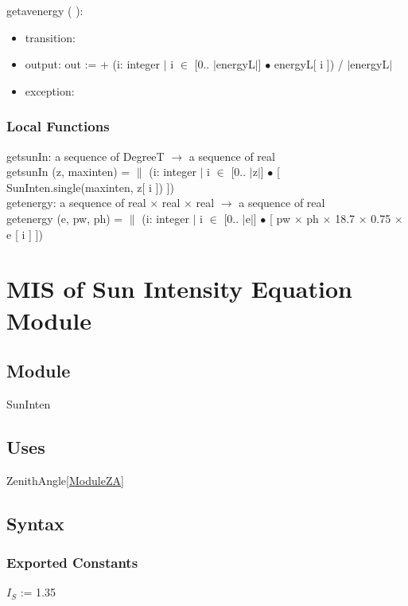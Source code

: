 \documentclass[12pt, titlepage]{article}
\begin{document}
\noindent  getavenergy ( ):
\begin{itemize}
\item transition: 
\item output: out := + (i: integer $|$ i $\in$ [0.. $|$energyL$|$] $\bullet$  energyL[ i ]) / $|$energyL$|$
\item exception: 
\end{itemize}


\subsubsection{Local Functions}
getsunIn: a sequence of DegreeT $\rightarrow$ a sequence of real\\
getsunIn (z, maxinten) = $\|$ (i: integer $|$ i $\in$ [0.. $|$z$|$] $\bullet$ [ SunInten.single(maxinten, z[ i ]) ])\\

getenergy: a sequence of real $\times$ real $\times$ real $\rightarrow$ a sequence of real\\
getenergy (e, pw, ph) =  $\|$ (i: integer $|$ i $\in$ [0.. $|$e$|$] $\bullet$ [ pw $\times$ ph $\times$ 18.7 $\times$ 0.75 $\times$ e [ i ] ])


\section{MIS of Sun Intensity Equation Module} \label{ModuleSI} 



\subsection{Module}
SunInten

\subsection{Uses}
ZenithAngle\ref{ModuleZA}

\subsection{Syntax}

\subsubsection{Exported Constants}
$I_{S}$ := 1.35\\
\end{document}
